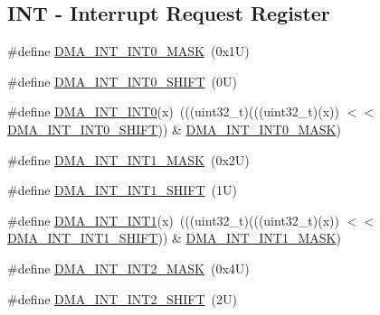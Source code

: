 \subsection*{I\+NT -\/ Interrupt Request Register}
\begin{DoxyCompactItemize}
\item 
\#define \mbox{\hyperlink{group___d_m_a___register___masks_gae312b72bdf9e9e1921e2ecca14baf3a3}{D\+M\+A\+\_\+\+I\+N\+T\+\_\+\+I\+N\+T0\+\_\+\+M\+A\+SK}}~(0x1\+U)
\item 
\#define \mbox{\hyperlink{group___d_m_a___register___masks_ga9a077d1184fbdd123ab2044dd012b179}{D\+M\+A\+\_\+\+I\+N\+T\+\_\+\+I\+N\+T0\+\_\+\+S\+H\+I\+FT}}~(0\+U)
\item 
\#define \mbox{\hyperlink{group___d_m_a___register___masks_ga79539e1f8334632c65c0ed141bd09f8a}{D\+M\+A\+\_\+\+I\+N\+T\+\_\+\+I\+N\+T0}}(x)~(((uint32\+\_\+t)(((uint32\+\_\+t)(x)) $<$$<$ \mbox{\hyperlink{group___d_m_a___register___masks_ga9a077d1184fbdd123ab2044dd012b179}{D\+M\+A\+\_\+\+I\+N\+T\+\_\+\+I\+N\+T0\+\_\+\+S\+H\+I\+FT}})) \& \mbox{\hyperlink{group___d_m_a___register___masks_gae312b72bdf9e9e1921e2ecca14baf3a3}{D\+M\+A\+\_\+\+I\+N\+T\+\_\+\+I\+N\+T0\+\_\+\+M\+A\+SK}})
\item 
\#define \mbox{\hyperlink{group___d_m_a___register___masks_ga3f1f39a6b66719e6534899bff632438b}{D\+M\+A\+\_\+\+I\+N\+T\+\_\+\+I\+N\+T1\+\_\+\+M\+A\+SK}}~(0x2\+U)
\item 
\#define \mbox{\hyperlink{group___d_m_a___register___masks_ga74ab9b94250b76e40285f610153c55b9}{D\+M\+A\+\_\+\+I\+N\+T\+\_\+\+I\+N\+T1\+\_\+\+S\+H\+I\+FT}}~(1\+U)
\item 
\#define \mbox{\hyperlink{group___d_m_a___register___masks_ga6d7944ca2dca6b4fec8050998509e1f7}{D\+M\+A\+\_\+\+I\+N\+T\+\_\+\+I\+N\+T1}}(x)~(((uint32\+\_\+t)(((uint32\+\_\+t)(x)) $<$$<$ \mbox{\hyperlink{group___d_m_a___register___masks_ga74ab9b94250b76e40285f610153c55b9}{D\+M\+A\+\_\+\+I\+N\+T\+\_\+\+I\+N\+T1\+\_\+\+S\+H\+I\+FT}})) \& \mbox{\hyperlink{group___d_m_a___register___masks_ga3f1f39a6b66719e6534899bff632438b}{D\+M\+A\+\_\+\+I\+N\+T\+\_\+\+I\+N\+T1\+\_\+\+M\+A\+SK}})
\item 
\#define \mbox{\hyperlink{group___d_m_a___register___masks_gaebc5eed7d9da43d58a7107731c4766dc}{D\+M\+A\+\_\+\+I\+N\+T\+\_\+\+I\+N\+T2\+\_\+\+M\+A\+SK}}~(0x4\+U)
\item 
\#define \mbox{\hyperlink{group___d_m_a___register___masks_gad06728afa85b6e94aa8756fb96f40e11}{D\+M\+A\+\_\+\+I\+N\+T\+\_\+\+I\+N\+T2\+\_\+\+S\+H\+I\+FT}}~(2\+U)
\item 

\end{DoxyCompactItemize}
